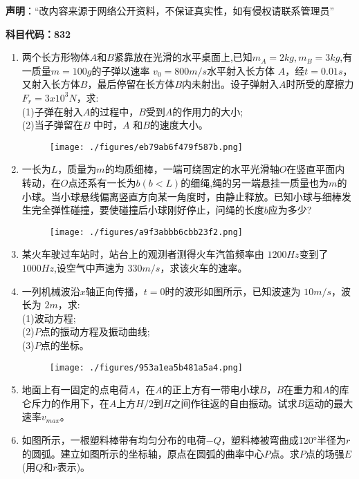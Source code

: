 
\textbf{声明}：“改内容来源于网络公开资料，不保证真实性，如有侵权请联系管理员”



\textbf{科目代码：832}
\begin{enumerate}
\item 两个长方形物体$A$和$B$紧靠放在光滑的水平桌面上,已知$m_A=2kg,m_B=3kg$,有一质量$ m=100g$的子弹以速率 $v_0=800m/s$水平射入长方体 $A$，经$t=0.01s$，又射入长方体$B$，最后停留在长方体$B$内未射出。设子弹射入$A$时所受的摩擦力$F_r=3x10^3N$，求:\\
(1)子弹在射入$A$的过程中，$B $受到$A$的作用力的大小;\\
(2)当子弹留在$ B$ 中时，$A$ 和$B$的速度大小。
\begin{figure}[ht]
\centering
\texttt{[image: ./figures/eb79ab6f479f587b.png]}
\caption{} \label{fig_SD11_3}
\end{figure}
\item 一长为$L$，质量为$m$的均质细棒，一端可绕固定的水平光滑轴$O$在竖直平面内转动，在$O$点还系有一长为$b(b<L)$的细绳,绳的另一端悬挂一质量也为$m$的小球。当小球悬线偏离竖直方向某一角度时，由静止释放。已知小球与细棒发生完全弹性碰撞，要使碰撞后小球刚好停止，问绳的长度$b$应为多少?
\begin{figure}[ht]
\centering
\texttt{[image: ./figures/a9f3abbb6cbb23f2.png]}
\caption{} \label{fig_SD11_4}
\end{figure}
\item 某火车驶过车站时，站台上的观测者测得火车汽笛频率由 $1200Hz$变到了 $1000 Hz$,设空气中声速为 $330m/s$，求该火车的速率。
\item 一列机械波沿$x$轴正向传播，$t=0$时的波形如图所示，已知波速为 $10m/s$，波长为 $2m$，求:\\
(1)波动方程;\\
(2)$P$点的振动方程及振动曲线;\\
(3)$P $点的坐标。
\begin{figure}[ht]
\centering
\texttt{[image: ./figures/953a1ea5b481a5a4.png]}
\caption{} \label{fig_SD11_5}
\end{figure}
\item 地面上有一固定的点电荷$ A$，在$A$的正上方有一带电小球$B$，$B$在重力和$A$的库仑斥力的作用下，在$A$上方$ H/2 $到$H$之间作往返的自由振动。试求$B$运动的最大速率$v_{max}$。
\item  如图所示，一根塑料棒带有均匀分布的电荷$-Q$，塑料棒被弯曲成120°半径为$r$的圆弧。建立如图所示的坐标轴，原点在圆弧的曲率中心$P$点。求$P$点的场强$E$(用$Q$和$r$表示)。

\end{enumerate}
